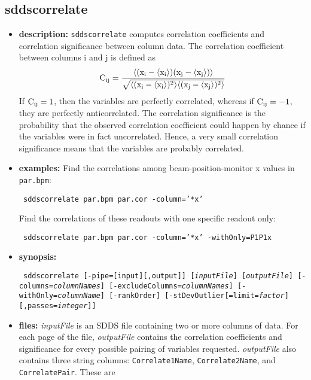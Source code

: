 \begin{latexonly}
\newpage
\end{latexonly}
\subsection{sddscorrelate}
\label{sddscorrelate}

\begin{itemize}
\item {\bf description:} 
{\tt sddscorrelate} computes correlation coefficients and correlation
significance between column data.  The correlation coefficient between
columns i and j is defined as
\[ {\rm C_{ij} = \frac{\langle (x_i-\langle x_i \rangle) (x_j-\langle x_j \rangle)\rangle}
{\sqrt{\langle (x_i-\langle x_i \rangle)^2\rangle \langle (x_j - \langle x_j \rangle)^2 \rangle}}} \]
If ${\rm C_{ij}=1}$, then the variables are perfectly correlated, whereas if ${\rm C_{ij}=-1}$, they
are perfectly anticorrelated.
The correlation significance is the probability that the observed correlation coefficient could happen
by chance if the variables were in fact uncorrelated.  Hence, a very small correlation significance
means that the variables are probably correlated.
\item {\bf examples:}
Find the correlations among beam-position-monitor x values in {\tt par.bpm}:
\begin{flushleft}{\tt
sddscorrelate par.bpm par.cor -column='*x' 
}\end{flushleft}
Find the correlations of these readouts with one specific readout only:
\begin{flushleft}{\tt
sddscorrelate par.bpm par.cor -column='*x' -withOnly=P1P1x
}\end{flushleft}
\item {\bf synopsis:}
\begin{flushleft}{\tt
sddscorrelate [-pipe=[input][,output]] [{\em inputFile}] [{\em outputFile}] 
[-columns={\em columnNames}] [-excludeColumns={\em columnNames}] 
[-withOnly={\em columnName}] [-rankOrder]
[-stDevOutlier[=limit={\em factor}][,passes={\em integer}]]
}\end{flushleft}
\item {\bf files:}
        {\em inputFile} is an SDDS file containing two or more columns of data.  For each page of
        the file, {\em outputFile} contains the correlation coefficients and significance for
        every possible pairing of variables requested.  {\em outputFile} also contains three string
        columns: {\tt Correlate1Name}, {\tt Correlate2Name}, and {\tt CorrelatePair}.  These are

\end{itemize}

